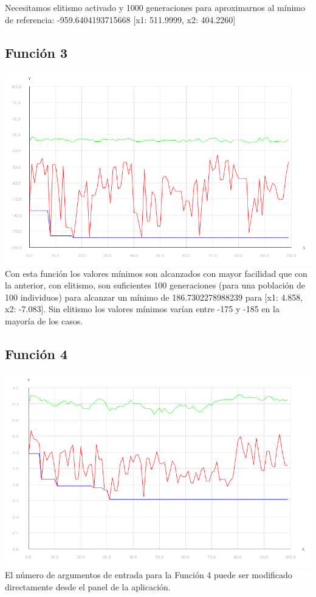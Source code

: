 \documentclass{article}
\begin{document}
Necesitamos elitismo activado y 1000 generaciones para aproximarnos al mínimo de referencia: -959.6404193715668 [x1: 511.9999, x2: 404.2260]
\subsection{Función 3}
\includegraphics[scale=0.5]{./images/graph3_bin.png}
Con esta función los valores mínimos son alcanzados con mayor facilidad que con la anterior, con elitismo, son suficientes 100 generaciones (para una población de 100 individuos) para alcanzar un mínimo de 186.7302278988239 para [x1: 4.858, x2: -7.083]. Sin elitismo los valores mínimos varían entre -175 y -185 en la mayoría de los casos.
\subsection{Función 4}
\includegraphics[scale=0.5]{./images/graph4_bin.png}
El número de argumentos de entrada para la Función 4 puede ser modificado directamente desde el panel de la aplicación.
\end{document}
